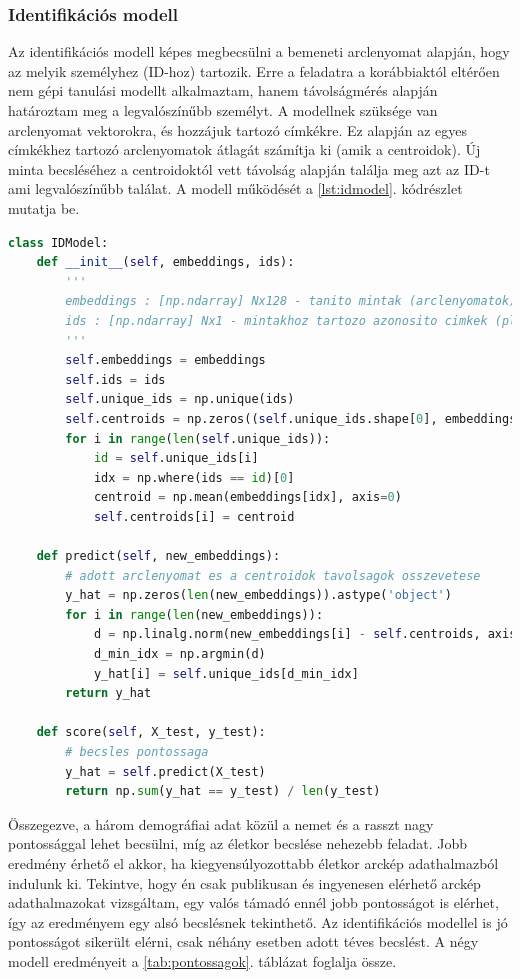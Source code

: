 \subsubsection*{Identifikációs modell}

Az identifikációs modell képes megbecsülni a bemeneti arclenyomat alapján, hogy az melyik személyhez (ID-hoz) tartozik. Erre a feladatra a korábbiaktól eltérően nem gépi tanulási modellt alkalmaztam, hanem távolságmérés alapján határoztam meg a legvalószínűbb személyt. A modellnek szüksége van arclenyomat vektorokra, és hozzájuk tartozó címkékre. Ez alapján az egyes címkékhez tartozó arclenyomatok átlagát számítja ki (amik a centroidok). Új minta becsléséhez a centroidoktól vett távolság alapján találja meg azt az ID-t ami legvalószínűbb találat. A modell működését a \ref{lst:idmodel}. kódrészlet mutatja be.

\begin{lstlisting}[language=python, caption=Az identifikációs modell működése., label=lst:idmodel]
class IDModel:
	def __init__(self, embeddings, ids):
		'''
		embeddings : [np.ndarray] Nx128 - tanito mintak (arclenyomatok)
		ids : [np.ndarray] Nx1 - mintakhoz tartozo azonosito cimkek (pl: 'id00001')
		'''
		self.embeddings = embeddings
		self.ids = ids
		self.unique_ids = np.unique(ids)
		self.centroids = np.zeros((self.unique_ids.shape[0], embeddings.shape[1]))
		for i in range(len(self.unique_ids)):
			id = self.unique_ids[i]
			idx = np.where(ids == id)[0]
			centroid = np.mean(embeddings[idx], axis=0)
			self.centroids[i] = centroid

	def predict(self, new_embeddings):
		# adott arclenyomat es a centroidok tavolsagok osszevetese
		y_hat = np.zeros(len(new_embeddings)).astype('object')
		for i in range(len(new_embeddings)):
			d = np.linalg.norm(new_embeddings[i] - self.centroids, axis=1, ord=2)
			d_min_idx = np.argmin(d)
			y_hat[i] = self.unique_ids[d_min_idx]
		return y_hat

	def score(self, X_test, y_test):
		# becsles pontossaga
		y_hat = self.predict(X_test)
		return np.sum(y_hat == y_test) / len(y_test)
\end{lstlisting}

Összegezve, a három demográfiai adat közül a nemet és a rasszt nagy pontossággal lehet becsülni, míg az életkor becslése nehezebb feladat. Jobb eredmény érhető el akkor, ha kiegyensúlyozottabb életkor arckép adathalmazból indulunk ki. Tekintve, hogy én csak publikusan és ingyenesen elérhető arckép adathalmazokat vizsgáltam, egy valós támadó ennél jobb pontosságot is elérhet, így az eredményem egy alsó becslésnek tekinthető. Az identifikációs modellel is jó pontosságot sikerült elérni, csak néhány esetben adott téves becslést. A négy modell eredményeit a \ref{tab:pontossagok}. táblázat foglalja össze.

